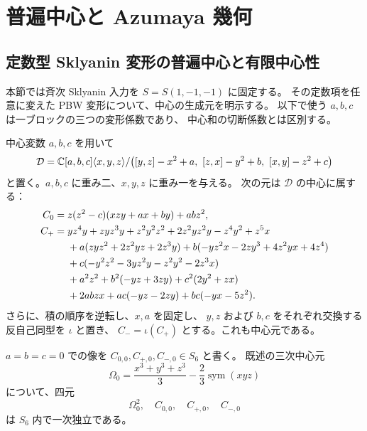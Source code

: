 \section{普遍中心と Azumaya 幾何}
\label{mix:sec:centers}

\subsection{定数型 Sklyanin 変形の普遍中心と有限中心性}
\label{cmo:subsec:pi-center}

本節では斉次 Sklyanin 入力を $S=S(1,-1,-1)$ に固定する。
その定数項を任意に変えた PBW 変形について、中心の生成元を明示する。
以下で使う $a,b,c$ は一ブロックの三つの変形係数であり、
中心和の切断係数とは区別する。

\begin{lemma}[普遍六次中心元]\label{cmo:lem:universal-sixth-center}
中心変数 $a,b,c$ を用いて
\[
 \mathcal D=\mathbb C[a,b,c]\langle x,y,z\rangle/
 \bigl([y,z]-x^2+a,\ [z,x]-y^2+b,\ [x,y]-z^2+c\bigr)
\]
と置く。$a,b,c$ に重み二、$x,y,z$ に重み一を与える。
次の元は $\mathcal D$ の中心に属する：
\begin{align}
 C_0={}&z(z^2-c)(xzy+ax+by)+abz^2,
 \label{cmo:eq:center-six-zero}\\
 C_+={}&yz^4y+zyz^3y+z^2y^2z^2+2z^2yz^2y-z^4y^2+z^5x
 \notag\\
 &+a(zyz^2+2z^2yz+2z^3y)
   +b(-yz^2x-2zy^3+4z^2yx+4z^4)
 \notag\\
 &+c(-y^2z^2-3yz^2y-z^2y^2-2z^3x)
 \notag\\
 &+a^2z^2+b^2(-yz+3zy)+c^2(2y^2+zx)
 \notag\\
 &+2abzx+ac(-yz-2zy)+bc(-yx-5z^2).
 \label{cmo:eq:center-six-positive}
\end{align}
さらに、積の順序を逆転し、$x,a$ を固定し、
$y,z$ および $b,c$ をそれぞれ交換する反自己同型を $\iota$ と置き、
$C_-=\iota(C_+)$ とする。これも中心元である。

$a=b=c=0$ での像を $C_{0,0},C_{+,0},C_{-,0}\in S_6$ と書く。
既述の三次中心元
\[
 \Omega_0=\frac{x^3+y^3+z^3}{3}-\frac23\operatorname{sym}(xyz)
\]
について、四元
\begin{equation}\label{cmo:eq:sixth-center-basis}
 \Omega_0^2,\quad C_{0,0},\quad C_{+,0},\quad C_{-,0}
\end{equation}
は $S_6$ 内で一次独立である。
\end{lemma}

